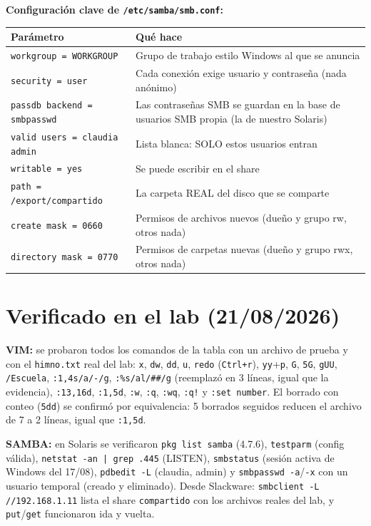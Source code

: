 \textbf{Configuración clave de \texttt{/etc/samba/smb.conf}:}

\begin{center}
\begin{tabularx}{\textwidth}{lX}
  \toprule
  \textbf{Parámetro} & \textbf{Qué hace} \\
  \midrule
  \texttt{workgroup = WORKGROUP} & Grupo de trabajo estilo Windows al que se anuncia \\
  \texttt{security = user} & Cada conexión exige usuario y contraseña (nada anónimo) \\
  \texttt{passdb backend = smbpasswd} & Las contraseñas SMB se guardan en la base de usuarios SMB propia (la de nuestro Solaris) \\
  \texttt{valid users = claudia admin} & Lista blanca: SOLO estos usuarios entran \\
  \texttt{writable = yes} & Se puede escribir en el share \\
  \texttt{path = /export/compartido} & La carpeta REAL del disco que se comparte \\
  \texttt{create mask = 0660} & Permisos de archivos nuevos (dueño y grupo rw, otros nada) \\
  \texttt{directory mask = 0770} & Permisos de carpetas nuevas (dueño y grupo rwx, otros nada) \\
  \bottomrule
\end{tabularx}
\end{center}

\section*{Verificado en el lab (21/08/2026)}

\textbf{VIM:} se probaron todos los comandos de la tabla con un archivo de prueba y con el \texttt{himno.txt} real del lab: \texttt{x}, \texttt{dw}, \texttt{dd}, \texttt{u}, \texttt{redo} (\texttt{Ctrl+r}), \texttt{yy}+\texttt{p}, \texttt{G}, \texttt{5G}, \texttt{gUU}, \texttt{/Escuela}, \texttt{:1,4s/a/-/g}, \texttt{:\%s/al/\#\#/g} (reemplazó en 3 líneas, igual que la evidencia), \texttt{:13,16d}, \texttt{:1,5d}, \texttt{:w}, \texttt{:q}, \texttt{:wq}, \texttt{:q!} y \texttt{:set number}. El borrado con conteo (\texttt{5dd}) se confirmó por equivalencia: 5 borrados seguidos reducen el archivo de 7 a 2 líneas, igual que \texttt{:1,5d}.

\textbf{SAMBA:} en Solaris se verificaron \texttt{pkg list samba} (4.7.6), \texttt{testparm} (config válida), \texttt{netstat -an | grep .445} (LISTEN), \texttt{smbstatus} (sesión activa de Windows del 17/08), \texttt{pdbedit -L} (claudia, admin) y \texttt{smbpasswd -a}/\texttt{-x} con un usuario temporal (creado y eliminado). Desde Slackware: \texttt{smbclient -L //192.168.1.11} lista el share \texttt{compartido} con los archivos reales del lab, y \texttt{put}/\texttt{get} funcionaron ida y vuelta.

